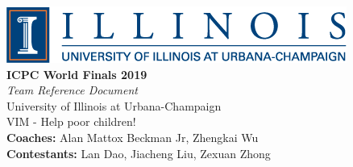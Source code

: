 \documentclass[10pt,letterpaper,landscape]{article}
\begin{document}

\thispagestyle{empty}

\begin{center}
    \includegraphics[scale=0.75]{logo.png} \\
    \vspace{20mm}
    {\Huge \textbf{ICPC World Finals 2019}} \\
    \vspace{10mm}
    {\LARGE \textit{Team Reference Document}} \\
    \vspace{30mm}
    {\LARGE University of Illinois at Urbana-Champaign} \\
    \vspace{5mm}
    {\LARGE VIM - Help poor children!} \\
    \vspace{30mm}
    {\Large \textbf{Coaches:} Alan Mattox Beckman Jr, Zhengkai Wu} \\
	\vspace{5mm}
	{\Large \textbf{Contestants:} Lan Dao, Jiacheng Liu, Zexuan Zhong}
\end{center}

\newpage
\end{document}
